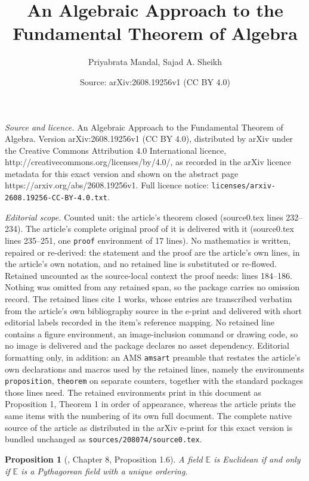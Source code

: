 \documentclass[10pt,a4paper]{amsart}
\title{An Algebraic Approach to the Fundamental Theorem of Algebra}
\author{Priyabrata Mandal, Sajad A. Sheikh}
\date{Source: arXiv:2608.19256v1 (CC BY 4.0)}
\newtheorem{proposition}{Proposition}
\begin{document}
\maketitle

\noindent\emph{Source and licence.} An Algebraic Approach to the Fundamental Theorem of Algebra. Version arXiv:2608.19256v1 (CC BY 4.0), distributed by arXiv under the Creative Commons Attribution 4.0 International licence, http://creativecommons.org/licenses/by/4.0/, as recorded in the arXiv licence metadata for this exact version and shown on the abstract page https://arxiv.org/abs/2608.19256v1. Full licence notice: \texttt{licenses/arxiv-2608.19256-CC-BY-4.0.txt}.\par\smallskip

\noindent\textit{Editorial scope.} Counted unit: the article's theorem closed (source0.tex lines 232--234). The article's complete original proof of it is delivered with it (source0.tex lines 235--251, one \texttt{proof} environment of 17 lines). No mathematics is written, repaired or re-derived: the statement and the proof are the article's own lines, in the article's own notation, and no retained line is substituted or re-flowed.  Retained uncounted as the source-local context the proof needs: lines 184--186.  Nothing was omitted from any retained span, so the package carries no omission record.  The retained lines cite 1 works, whose entries are transcribed verbatim from the article's own bibliography source in the e-print and delivered with short editorial labels recorded in the item's reference mapping.  No retained line contains a figure environment, an image-inclusion command or drawing code, so no image is delivered and the package declares no asset dependency.  Editorial formatting only, in addition: an AMS \texttt{amsart} preamble that restates the article's own declarations and macros used by the retained lines, namely the environments \texttt{proposition}, \texttt{theorem} on separate counters, together with the standard packages those lines need.  The retained environments print in this document as Proposition 1, Theorem 1 in order of appearance, whereas the article prints the same items with the numbering of its own full document.  The complete native source of the article as distributed in the arXiv e-print for this exact version is bundled unchanged as \texttt{sources/208074/source0.tex}.
\begin{proposition}[\cite{lam}, Chapter 8, Proposition 1.6]\label{Euclidean is Pythagorean}
    A field $\mathbb E$ is Euclidean if and only if $\mathbb E$ is a Pythagorean field with a unique ordering.
\end{proposition}
\end{document}
